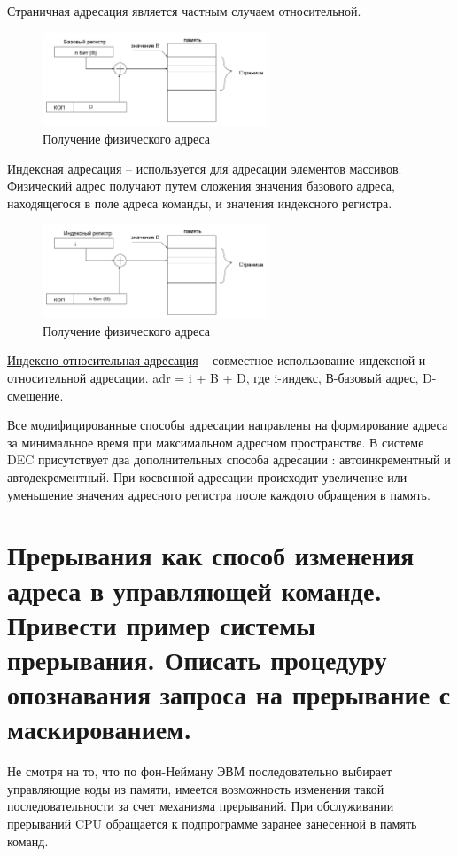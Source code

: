 \documentclass[unicode, 12pt, a4paper, oneside]{article}
\begin{document}
Страничная адресация является частным случаем относительной. 
\begin{figure}[H]
\centering
\includegraphics[width=0.6\textwidth]{111_Otnositelna.JPG}
\caption{Получение физического адреса}
\end{figure}


\underline{Индексная адресация} -- используется для адресации элементов массивов. Физический адрес получают путем сложения значения базового адреса, находящегося в поле адреса команды, и значения индексного регистра.\\
\begin{figure}[H]
\centering
\includegraphics[width=0.6\textwidth]{111_Indexna.JPG}
\caption{Получение физического адреса}
\end{figure} 
\underline{Индексно-относительная адресация} -- совместное использование индексной и относительной адресации. 
adr = i + B + D, где i-индекс, В-базовый адрес, D-смещение.

Все модифицированные способы адресации направлены на формирование адреса за минимальное время при максимальном адресном пространстве. В системе DEC присутствует два дополнительных способа адресации : автоинкрементный и автодекрементный. При косвенной адресации происходит увеличение или уменьшение значения адресного регистра после каждого обращения в память.

\section{Прерывания как способ изменения адреса в управляющей команде. Привести пример системы прерывания. Описать процедуру опознавания запроса на прерывание с маскированием.}

Не смотря на то, что по фон-Нейману ЭВМ последовательно выбирает управляющие коды из памяти, имеется возможность изменения такой последовательности за счет механизма прерываний. При обслуживании прерываний CPU обращается к подпрограмме заранее занесенной в память команд.
\end{document}
